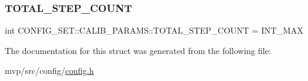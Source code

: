 \subsubsection{\texorpdfstring{T\+O\+T\+A\+L\+\_\+\+S\+T\+E\+P\+\_\+\+C\+O\+U\+NT}{TOTAL\_STEP\_COUNT}}
{\footnotesize\ttfamily int C\+O\+N\+F\+I\+G\+\_\+\+S\+E\+T\+::\+C\+A\+L\+I\+B\+\_\+\+P\+A\+R\+A\+M\+S\+::\+T\+O\+T\+A\+L\+\_\+\+S\+T\+E\+P\+\_\+\+C\+O\+U\+NT = I\+N\+T\+\_\+\+M\+AX}



The documentation for this struct was generated from the following file\+:\begin{DoxyCompactItemize}
\item 
mvp/src/config/\hyperlink{config_8h}{config.\+h}\end{DoxyCompactItemize}
